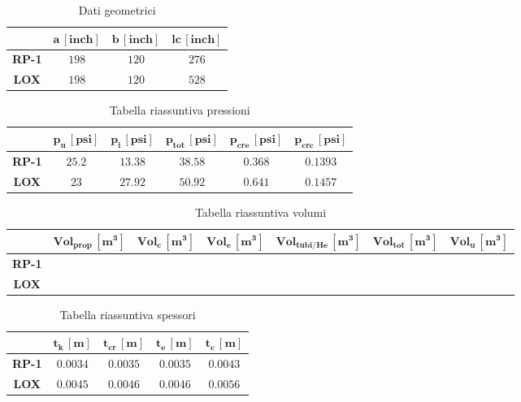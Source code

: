 \begin{table}[H]

\centering
\begin{tabular}{|c|c|c|c|}
\hline
& $\bm{a \, [inch]}$ & $\bm{b \, [inch]}$ & $\bm{lc \, [inch]}$ \\
\hline
\textbf{RP-1} & $198$ & $120$ & $276$ \\
\hline
\textbf{LOX} & $198$ & $120$ & $528$ \\
\hline
\end{tabular}


\caption{Dati geometrici}
\label{table:dati_geometrici}
\end{table}


\begin{table}[H]

\centering
\begin{tabular}{|c|c|c|c|c|c|}
\hline
& $\bm{p_{u} \, [psi]}$ & $\bm{p_{i} \, [psi]}$ & $\bm{p_{tot} \, [psi]}$ & $\bm{p_{cre} \, [psi]}$ & $\bm{p_{crc} \, [psi]}$\\
\hline
\textbf{RP-1} & $25.2$ & $13.38$ & $38.58$ & $0.368$ & $0.1393$\\
\hline
\textbf{LOX} & $23$ & $27.92$ & $50.92$ & $0.641$ & $0.1457$\\
\hline
\end{tabular}


\caption{Tabella riassuntiva pressioni}
\label{table:pressioni}
\end{table}

\begin{table}[H]

\centering
\begin{tabular}{|c|c|c|c|c|c|c|}
\hline
& $\bm{Vol_{prop} \, [m^3]}$ & $\bm{Vol_{c} \, [m^3]}$ & $\bm{Vol_{e} \, [m^3]}$ & $\bm{Vol_{tubi/He} \, [m^3]}$ & $\bm{Vol_{tot} \, [m^3]}$ & $\bm{Vol_{u} \, [m^3]} $\\
\hline
\textbf{RP-1} & $ $ & $ $ & $ $ & $ $ & $ $ & $ $\\
\hline
\textbf{LOX} & $ $ & $ $ & $ $ & $ $ & $ $ & $ $\\
\hline
\end{tabular}


\caption{Tabella riassuntiva volumi}
\label{table:volumi}
\end{table}


\begin{table}[H]

\centering
\begin{tabular}{|c|c|c|c|c|}
\hline
& $\bm{t_{k} \, [m]}$ & $\bm{t_{cr} \, [m]}$ & $\bm{t_{e} \, [m]}$ & $\bm{t_{c}\, [m]}$\\
\hline
\textbf{RP-1} & $0.0034$ & $0.0035$ & $0.0035$ & $0.0043$\\
\hline
\textbf{LOX} & $0.0045$ & $0.0046$ & $0.0046$ & $0.0056$\\
\hline
\end{tabular}


\caption{Tabella riassuntiva spessori}
\label{table:spessori}


\end{table}



